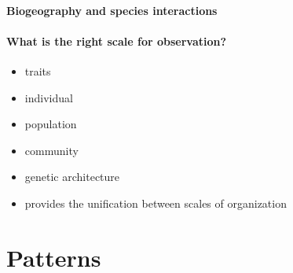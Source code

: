 \documentclass[11pt,oneside]{article}
\begin{document}
\paragraph{Biogeography and species interactions}


\paragraph{What is the right scale for observation?}

\begin{itemize}
	\item traits
	\item individual
                \item population
                \item community
	\item genetic architecture
	\item provides the unification between scales of organization
\end{itemize}

\section{Patterns}
\end{document}
